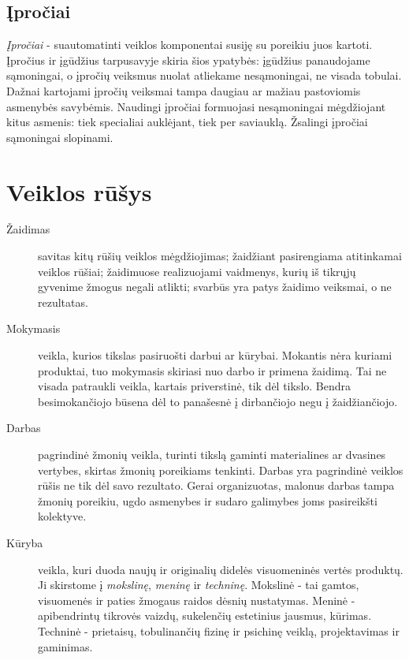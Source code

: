 \subsection{Įpročiai}

\emph{Įpročiai} - suautomatinti veiklos komponentai susiję su poreikiu juos
kartoti. Įpročius ir įgūdžius tarpusavyje skiria šios ypatybės: įgūdžius 
panaudojame sąmoningai, o įpročių veiksmus nuolat atliekame nesąmoningai, ne
visada tobulai. Dažnai kartojami įpročių veiksmai tampa daugiau ar mažiau
pastoviomis asmenybės savybėmis. Naudingi įpročiai formuojasi nesąmoningai
mėgdžiojant kitus asmenis: tiek specialiai auklėjant, tiek per saviauklą.
Žsalingi įpročiai sąmoningai slopinami.

\section{Veiklos rūšys}

\label{tema:veiklos_rusys}

\begin{description}
  \item[Žaidimas] savitas kitų rūšių veiklos mėgdžiojimas; žaidžiant 
  pasirengiama atitinkamai veiklos rūšiai; žaidimuose realizuojami vaidmenys,
  kurių iš tikrųjų gyvenime žmogus negali atlikti; svarbūs yra patys 
  žaidimo veiksmai, o ne rezultatas.
  \item[Mokymasis] veikla, kurios tikslas pasiruošti darbui ar kūrybai.
  Mokantis nėra kuriami produktai, tuo mokymasis skiriasi nuo darbo ir 
  primena žaidimą. Tai ne visada patraukli veikla, kartais priverstinė, tik
  dėl tikslo. Bendra besimokančiojo būsena dėl to panašesnė į dirbančiojo
  negu į žaidžiančiojo.
  \item[Darbas] pagrindinė žmonių veikla, turinti tikslą gaminti materialines
  ar dvasines vertybes, skirtas žmonių poreikiams tenkinti. Darbas yra
  pagrindinė veiklos rūšis ne tik dėl savo rezultato. Gerai organizuotas,
  malonus darbas tampa žmonių poreikiu, ugdo asmenybes ir sudaro galimybes
  joms pasireikšti kolektyve.
  \item[Kūryba] veikla, kuri duoda naujų ir originalių didelės visuomeninės 
  vertės produktų. Ji skirstome į \emph{mokslinę}, \emph{meninę} ir 
  \emph{techninę}. Mokslinė - tai gamtos, visuomenės ir paties žmogaus raidos
  dėsnių nustatymas. Meninė - apibendrintų tikrovės vaizdų, sukelenčių
  estetinius jausmus, kūrimas. Techninė - prietaisų, tobulinančių fizinę ir
  psichinę veiklą, projektavimas ir gaminimas.
\end{description}

